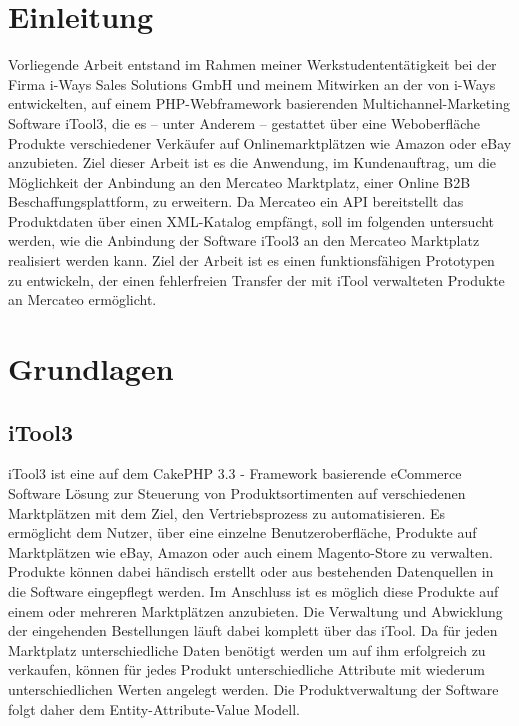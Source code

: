 

\clearpage
\section{Einleitung}
\vspace*{\fill}
\begin{center}
\begin{minipage}{.6\textwidth}

Vorliegende Arbeit entstand im Rahmen meiner Werkstudententätigkeit bei der Firma i-Ways Sales Solutions GmbH und meinem Mitwirken
an der von i-Ways entwickelten, auf einem PHP-Webframework basierenden Multichannel-Marketing Software iTool3, die es -- unter Anderem -- gestattet über eine Weboberfläche Produkte verschiedener
Verkäufer auf Onlinemarktplätzen wie Amazon oder eBay anzubieten.
Ziel dieser Arbeit ist es die Anwendung, im Kundenauftrag, um die Möglichkeit der Anbindung an den Mercateo Marktplatz, einer Online B2B Beschaffungsplattform, zu erweitern.
Da Mercateo ein API bereitstellt das Produktdaten über einen XML-Katalog empfängt, soll im folgenden untersucht werden, wie die Anbindung der Software iTool3 an den Mercateo Marktplatz realisiert werden kann. Ziel der Arbeit ist es einen funktionsfähigen Prototypen zu entwickeln, der einen fehlerfreien Transfer der mit iTool verwalteten Produkte an Mercateo ermöglicht.
\end{minipage}
\end{center}
\vfill %
\clearpage

\pagebreak

\section{Grundlagen}

	
	\subsection{iTool3}
	
	iTool3 ist eine auf dem CakePHP 3.3 - Framework basierende eCommerce Software Lösung zur Steuerung von Produktsortimenten auf verschiedenen Marktplätzen mit dem Ziel, den
	Vertriebsprozess zu automatisieren. Es ermöglicht dem Nutzer, über eine einzelne Benutzeroberfläche, Produkte auf Marktplätzen wie eBay, Amazon oder auch einem Magento-Store
	zu verwalten. Produkte können dabei händisch erstellt oder aus bestehenden Datenquellen in die Software	eingepflegt werden. Im Anschluss ist es möglich diese Produkte auf einem oder mehreren Marktplätzen anzubieten. Die Verwaltung und Abwicklung der eingehenden Bestellungen läuft dabei komplett über das iTool.
	Da für jeden Marktplatz unterschiedliche Daten benötigt werden um auf ihm erfolgreich zu verkaufen, können für jedes Produkt unterschiedliche Attribute mit wiederum unterschiedlichen Werten angelegt werden. Die Produktverwaltung der Software folgt daher dem Entity-Attribute-Value Modell.
	
